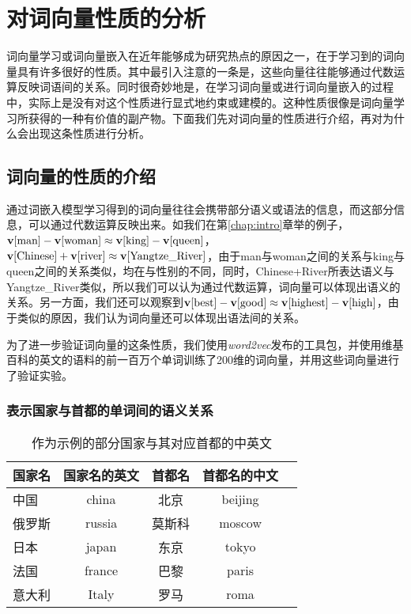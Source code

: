 \iffalse



\fi

\chapter{对词向量性质的分析}

词向量学习或词向量嵌入在近年能够成为研究热点的原因之一，在于学习到的词向量具有许多很好的性质。其中最引入注意的一条是，这些向量往往能够通过代数运算反映词语间的关系。同时很奇妙地是，在学习词向量或进行词向量嵌入的过程中，实际上是没有对这个性质进行显式地约束或建模的。这种性质很像是词向量学习所获得的一种有价值的副产物。下面我们先对词向量的性质进行介绍，再对为什么会出现这条性质进行分析。

\section{词向量的性质的介绍}

通过词嵌入模型学习得到的词向量往往会携带部分语义或语法的信息，而这部分信息，可以通过代数运算反映出来。如我们在第\ref{chap:intro}章举的例子，${{\mathbf v}}[\mbox{man}]-{{\mathbf v}}[\mbox{woman}] \approx {{\mathbf v}}[\mbox{king}] - {{\mathbf v}}[\mbox{queen}]$，${{\mathbf v}}[\mbox{Chinese}] + {{\mathbf v}}[\mbox{river}] \approx {{\mathbf v}}[\mbox{Yangtze\_River}]$，由于man与woman之间的关系与king与queen之间的关系类似，均在与性别的不同，同时，Chinese+River所表达语义与Yangtze\_River类似，所以我们可以认为通过代数运算，词向量可以体现出语义的关系。另一方面，我们还可以观察到${{\mathbf v}}[\mbox{best}]-{{\mathbf v}}[\mbox{good}] \approx {{\mathbf v}}[\mbox{highest}] - {{\mathbf v}}[\mbox{high}]$，由于类似的原因，我们认为词向量还可以体现出语法间的关系。

为了进一步验证词向量的这条性质，我们使用\emph{word2vec}发布的工具包，并使用维基百科的英文的语料的前一百万个单词训练了200维的词向量，并用这些词向量进行了验证实验。

\subsection{表示国家与首都的单词间的语义关系}

\begin{longtable}{lcccc}
\caption[部分国家与其对应首都的中英文名称]{作为示例的部分国家与其对应首都的中英文} \label{tab:CountyCity} \\
\toprule[1.5pt]
国家名 & 国家名的英文 & 首都名 & 首都名的中文\\
\midrule[1pt]
中国	&	china	&	北京	&	beijing\\
俄罗斯	&	russia	&	莫斯科	&	moscow	\\
日本	&	japan	&	东京	&	tokyo	\\
法国	&	france	&	巴黎	&	paris	\\
意大利	&	Italy	&	罗马	&	roma	\\
\endfirsthead

\end{longtable}

